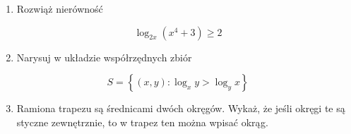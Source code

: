 \documentclass[10pt]{article}
\begin{document}
\begin{enumerate}
  \item Rozwiąż nierówność
\end{enumerate}

\[
\log _{2 x}\left(x^{4}+3\right) \geq 2
\]

\begin{enumerate}
  \setcounter{enumi}{1}
  \item Narysuj w układzie współrzędnych zbiór
\end{enumerate}

\[
S=\left\{(x, y): \log _{x} y>\log _{y} x\right\}
\]

\begin{enumerate}
  \setcounter{enumi}{2}
  \item Ramiona trapezu są średnicami dwóch okręgów. Wykaż, że jeśli okręgi te są styczne zewnętrznie, to w trapez ten można wpisać okrąg.
\end{enumerate}
\end{document}
